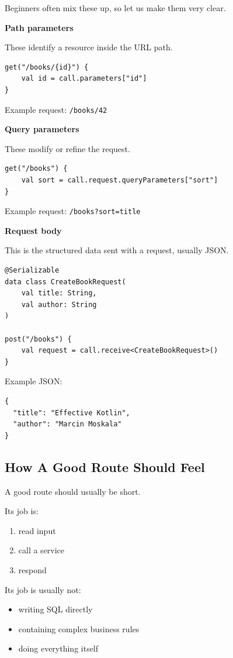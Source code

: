 \documentclass[11pt,a4paper]{article}
\begin{document}
Beginners often mix these up, so let us make them very clear.

\textbf{Path parameters}

These identify a resource inside the URL path.

\begin{lstlisting}[style=kazekotlin]
get("/books/{id}") {
    val id = call.parameters["id"]
}
\end{lstlisting}

Example request:
\texttt{/books/42}

\textbf{Query parameters}

These modify or refine the request.

\begin{lstlisting}[style=kazekotlin]
get("/books") {
    val sort = call.request.queryParameters["sort"]
}
\end{lstlisting}

Example request:
\texttt{/books?sort=title}

\textbf{Request body}

This is the structured data sent with a request, usually JSON.

\begin{lstlisting}[style=kazekotlin]
@Serializable
data class CreateBookRequest(
    val title: String,
    val author: String
)

post("/books") {
    val request = call.receive<CreateBookRequest>()
}
\end{lstlisting}

Example JSON:

\begin{lstlisting}[style=kazekotlin]
{
  "title": "Effective Kotlin",
  "author": "Marcin Moskala"
}
\end{lstlisting}

\subsection{How A Good Route Should Feel}

A good route should usually be short.

Its job is:
\begin{enumerate}
    \item read input
    \item call a service
    \item respond
\end{enumerate}

Its job is usually not:
\begin{itemize}
    \item writing SQL directly
    \item containing complex business rules
    \item doing everything itself
\end{itemize}
\end{document}
